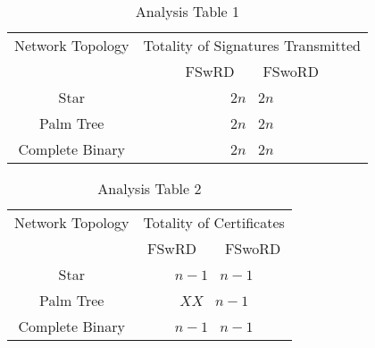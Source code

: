 		\begin{table}[!htb]
			\begin{center}
				\caption{Analysis Table 1}
				\label{tab:analysis-table-1}
				\begin{tabular}{|c||c|}
					\hline
					Network Topology & Totality of Signatures Transmitted \\ 
					\cline{2-2}
					 & FSwRD \mbox{   } \vline \mbox{   } FSwoRD \\
					\hline
					\hline
					Star & $2n$ \vline \mbox{   }$2n$ \\
					\hline
					Palm Tree & $2n$ \vline \mbox{   }$2n$\\
					\hline
					Complete Binary & $2n$ \vline \mbox{   }$2n$\\
					\hline
				\end{tabular}
			\end{center}
		\end{table}

		\begin{table}[!htb]
			\begin{center}
				\caption{Analysis Table 2}
				\label{tab:analysis-table-2}
				\begin{tabular}{|c||c|}
					\hline
					Network Topology & Totality of Certificates \\ 
					\cline{2-2}
					 & FSwRD \mbox{   } \vline \mbox{   } FSwoRD \\
					\hline
					\hline
					Star & $n - 1$ \vline \mbox{   }$n -1$ \\
					\hline
					Palm Tree & $XX$ \vline \mbox{   }$n - 1$\\
					\hline
					Complete Binary & $n - 1$ \vline \mbox{   }$n - 1$\\
					\hline
				\end{tabular}
			\end{center}
		\end{table}

